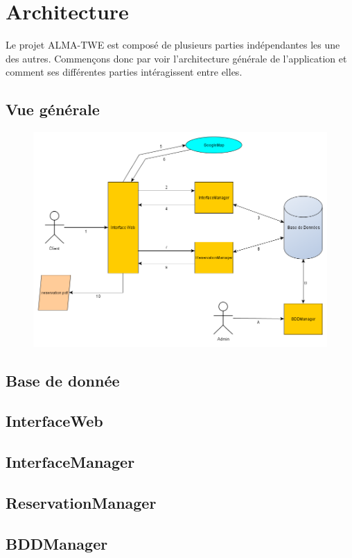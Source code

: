 \chapter{Architecture}

	Le projet ALMA-TWE est composé de plusieurs parties indépendantes les une des autres. Commençons donc par voir l'architecture générale de l'application et comment ses différentes parties intéragissent entre elles. 

	\section{Vue générale}
	
		\begin{figure}[!h]
			\centering
			\includegraphics[width=1\textwidth]{overview}
		\end{figure}
		
	\section{Base de donnée}
		
	\section{InterfaceWeb}
	
	\section{InterfaceManager}
	
	\section{ReservationManager}
	
	\section{BDDManager}
		
		
\clearpage
